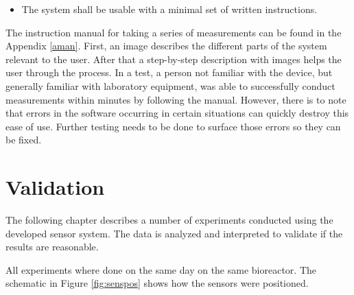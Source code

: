 \begin{itemize}
\item  The system shall be usable with a minimal set of written instructions.\\
\end{itemize}

The instruction manual for taking a series of measurements can be found in the Appendix \ref{aman}. First, an image describes the different parts of the system relevant to the user. After that a step-by-step description with images helps the user through the process. In a test, a person not familiar with the device, but generally familiar with laboratory equipment, was able to successfully conduct measurements within minutes by following the manual. However, there is to note that errors in the software occurring in certain situations can quickly destroy this ease of use. Further testing needs to be done to surface those errors so they can be fixed.

\section{Validation} \label{val}

The following chapter describes a number of experiments conducted using the developed sensor system. The data is analyzed and interpreted to validate if the results are reasonable. 

All experiments where done on the same day on the same bioreactor. The schematic in Figure \ref{fig:senspos} shows how the sensors were positioned.

